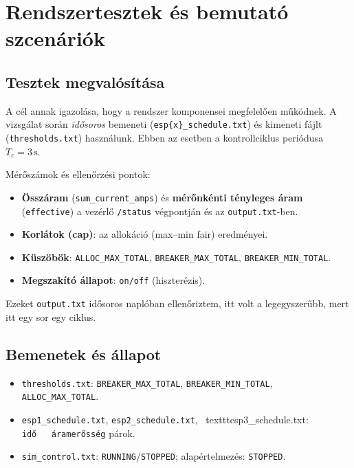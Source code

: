 \chapter{Rendszertesztek és bemutató szcenáriók}

\section{Tesztek megvalósítása}
A cél annak igazolása, hogy a rendszer komponensei megfelelően működnek. 
A vizsgálat során \emph{idősoros} bemeneti (\texttt{esp\{x\}\_schedule.txt}) és kimeneti 
fájlt (\texttt{thresholds.txt}) használunk. 
Ebben az esetben a kontrollciklus periódusa \(T_c=3\,\mathrm{s}\).

Mérőszámok és ellenőrzési pontok:
\begin{itemize}
  \item \textbf{Összáram} (\texttt{sum\_current\_amps}) és \textbf{mérőnkénti tényleges áram} (\texttt{effective}) 
  a vezérlő \texttt{/status} végpontján és az \texttt{output.txt}-ben.
  \item \textbf{Korlátok (cap)}: az allokáció (max--min fair) eredményei.
  \item \textbf{Küszöbök}: \texttt{ALLOC\_MAX\_TOTAL}, \texttt{BREAKER\_MAX\_TOTAL}, \texttt{BREAKER\_MIN\_TOTAL}.
  \item \textbf{Megszakító állapot}: \texttt{on/off} (hiszterézis).
\end{itemize}

Ezeket \texttt{output.txt} idősoros naplóban ellenőriztem, itt volt a legegyszerűbb, 
mert itt egy sor egy ciklus.

\section{Bemenetek és állapot}
\begin{itemize}
  \item \texttt{thresholds.txt}: \texttt{BREAKER\_MAX\_TOTAL}, 
  \texttt{BREAKER\_MIN\_TOTAL}, \texttt{ALLOC\_MAX\_TOTAL}.
  \item \texttt{esp1\_schedule.txt}, \texttt{esp2\_schedule.txt}, \
  texttt{esp3\_schedule.txt}: \texttt{idő\ \ \ áramerősség} párok.
  \item \texttt{sim\_control.txt}: \texttt{RUNNING}/\texttt{STOPPED}; alapértelmezés: \texttt{STOPPED}.
\end{itemize}

